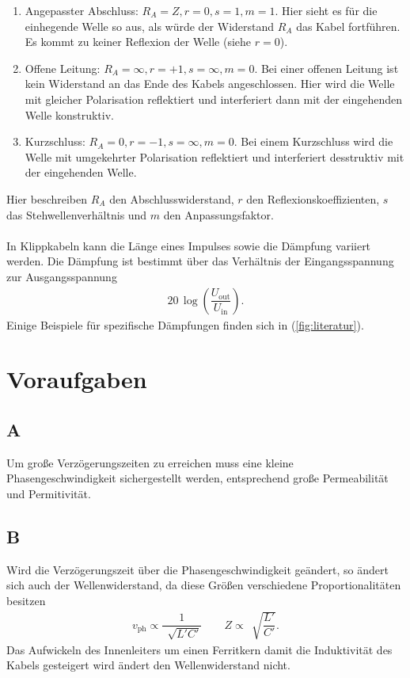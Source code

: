 \documentclass[a4paper,10pt]{article}
\numberwithin{equation}{section}
\begin{document}
\begin{enumerate}[label=--]
        \item Angepasster Abschluss: $R_A=Z,r=0,s=1,m=1$. 
                Hier sieht es für die einhegende Welle so aus, als würde der Widerstand $R_A$ das Kabel fortführen.
                Es kommt zu keiner Reflexion der Welle (siehe $r=0$).
        \item Offene Leitung: $R_A=\infty,r=+1,s=\infty,m=0$.
                Bei einer offenen Leitung ist kein Widerstand an das Ende des Kabels angeschlossen.
                Hier wird die Welle mit gleicher Polarisation reflektiert und interferiert dann mit der eingehenden Welle konstruktiv.
        \item Kurzschluss: $R_A=0,r=-1,s=\infty,m=0$.
                Bei einem Kurzschluss wird die Welle mit umgekehrter Polarisation reflektiert und interferiert desstruktiv mit der eingehenden Welle.
\end{enumerate}
Hier beschreiben $R_A$ den Abschlusswiderstand, $r$ den Reflexionskoeffizienten, $s$ das Stehwellenverhältnis und $m$ den Anpassungsfaktor.\\\\
In Klippkabeln kann die Länge eines Impulses sowie die Dämpfung variiert werden.
Die Dämpfung ist bestimmt über das Verhältnis der Eingangsspannung zur Ausgangsspannung
\begin{align} 
        20\,\log\left(\dfrac{U_\text{out}}{U_\text{in}}\right)
.\end{align} 
Einige Beispiele für spezifische Dämpfungen finden sich in (\ref{fig:literatur}). 

\newpage
\section{Voraufgaben}
\subsection{A}
Um große Verzögerungszeiten zu erreichen muss eine kleine Phasengeschwindigkeit sichergestellt werden, entsprechend große Permeabilität und Permitivität.

\subsection{B}
Wird die Verzögerungszeit über die Phasengeschwindigkeit geändert, so ändert sich auch der Wellenwiderstand, da diese Größen verschiedene Proportionalitäten besitzen
\begin{align} 
        v_{\text{ph}}\propto \dfrac{1}{\,\sqrt[]{L'C'}}\qquad Z\propto \,\sqrt[]{\dfrac{L'}{C'}}
.\end{align} 
Das Aufwickeln des Innenleiters um einen Ferritkern damit die Induktivität des Kabels gesteigert wird ändert den Wellenwiderstand nicht.
\end{document}
